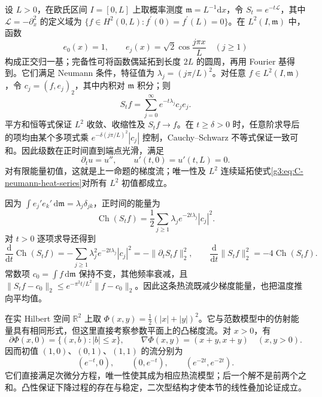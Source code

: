 \begin{example}\label{g3:exm:C-neumann-cosine-heat}
	设 \(L>0\)，在欧氏区间 \(I=[0,L]\) 上取概率测度 \(\mathfrak m=L^{-1}\mathrm dx\)，令 \(S_t=e^{-t\mathcal L}\)，其中 \(\mathcal L=-\partial_x^2\) 的定义域为 \(\{f\in H^2(0,L):f^\prime(0)=f^\prime(L)=0\}\)。在 \(L^2(I,\mathfrak m)\) 中，函数
	\[
		e_0(x)=1,\qquad e_j(x)=\sqrt2\cos\frac{j\pi x}{L}\quad(j\ge1)
	\]
	构成正交归一基；完备性可将函数偶延拓到长度 \(2L\) 的圆周，再用 Fourier 基得到。它们满足 Neumann 条件，特征值为 \(\lambda_j=(j\pi/L)^2\)。对任意 \(f\in L^2(I,\mathfrak m)\)，令 \(c_j=(f,e_j)_2\)，其中内积对 \(\mathfrak m\) 积分；则
	\begin{equation}\label{g3:eq:C-neumann-heat-series}
		S_tf=\sum_{j=0}^\infty e^{-t\lambda_j}c_je_j.
	\end{equation}
	平方和恒等式保证 \(L^2\) 收敛、收缩性及 \(S_tf\to f\)。在 \(t\ge\delta>0\) 时，任意阶求导后的项均由某个多项式乘 \(e^{-\delta(j\pi/L)^2}|c_j|\) 控制，Cauchy--Schwarz 不等式保证一致可和。因此级数在正时间直到端点光滑，满足
	\[
		\partial_tu=u'',\qquad u'(t,0)=u'(t,L)=0.
	\]
	对有限能量初值，这就是上一命题的梯度流；唯一性及 \(L^2\) 连续延拓使式\eqref{g3:eq:C-neumann-heat-series}对所有 \(L^2\) 初值都成立。

	因为 \(\int e_j'e_k'\,\mathrm d\mathfrak m=\lambda_j\delta_{jk}\)，正时间的能量为
	\[
		\operatorname{Ch}(S_tf)=\frac12\sum_{j\ge1}\lambda_je^{-2t\lambda_j}|c_j|^2.
	\]
	对 \(t>0\) 逐项求导还得到
	\[
		\frac{\mathrm d}{\mathrm dt}\operatorname{Ch}(S_tf)
			=-\sum_{j\ge1}\lambda_j^2e^{-2t\lambda_j}|c_j|^2
			=-\|\partial_tS_tf\|_2^2,
		\qquad
		\frac{\mathrm d}{\mathrm dt}\|S_tf\|_2^2=-4\operatorname{Ch}(S_tf).
	\]
	常数项 \(c_0=\int f\,\mathrm d\mathfrak m\) 保持不变，其他频率衰减，且
	\(\|S_tf-c_0\|_2\le e^{-\pi^2t/L^2}\|f-c_0\|_2\)。因此这条热流既减少梯度能量，也把温度推向平均值。
\end{example}

\begin{example}\label{g3:exm:C-nonlinear-convex-flow}
	在实 Hilbert 空间 \(\mathbb R^2\) 上取 \(\Phi(x,y)=\tfrac12(|x|+|y|)^2\)。它与范数模型中的仿射能量具有相同形式，但这里直接考察参数平面上的凸梯度流。对 \(x>0\)，有
	\[
		\partial\Phi(x,0)=\{(x,b):|b|\le x\},
		\qquad \nabla\Phi(x,y)=(x+y,x+y)\quad(x,y>0).
	\]
	因而初值 \((1,0)\)、\((0,1)\)、\((1,1)\) 的流分别为
	\[
		(e^{-t},0),\qquad(0,e^{-t}),\qquad(e^{-2t},e^{-2t}).
	\]
	它们直接满足次微分方程，唯一性使其成为相应热流模型；后一个解不是前两个之和。凸性保证下降过程的存在与稳定，二次型结构才使本节的线性叠加论证成立。
\end{example}

